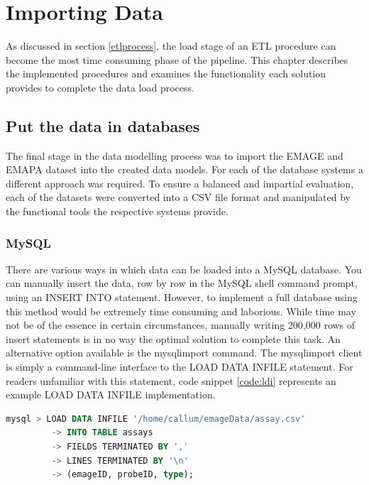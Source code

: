 \chapter{Importing Data}\label{dataload}
As discussed in section \ref{etlprocess}, the load stage of an ETL procedure can become the most time consuming phase of the pipeline. This chapter describes the implemented procedures and examines the functionality each solution provides to complete the data load process.

\section{Put the data in databases}\label{loadsection}
The final stage in the data modelling process was to import the EMAGE and EMAPA dataset into the created data models. For each of the database systems a different approach was required. To ensure a balanced and impartial evaluation, each of the datasets were converted into a CSV file format and manipulated by the functional tools the respective systems provide.

\subsection{MySQL}\label{mysqlload}
There are various ways in which data can be loaded into a MySQL database. You can manually insert the data, row by row in the MySQL shell command prompt, using an INSERT INTO statement. However, to implement a full database using this method would be extremely time consuming and laborious. While time may not be of the essence in certain circumstances, manually writing 200,000 rows of insert statements is in no way the optimal solution to complete this task. An alternative option available is the mysqlimport command. The mysqlimport client is simply a command-line interface to the LOAD DATA INFILE statement. For readers unfamiliar with this statement, code snippet \ref{code:ldi} represents an example LOAD DATA INFILE implementation.
\newpage
\begin{lstlisting}[language=SQL, caption=Example LOAD DATA INFILE statement., label=code:ldi]
mysql > LOAD DATA INFILE '/home/callum/emageData/assay.csv'
	 	 -> INTO TABLE assays
		 -> FIELDS TERMINATED BY ','
		 -> LINES TERMINATED BY '\n'
		 -> (emageID, probeID, type);
\end{lstlisting}

